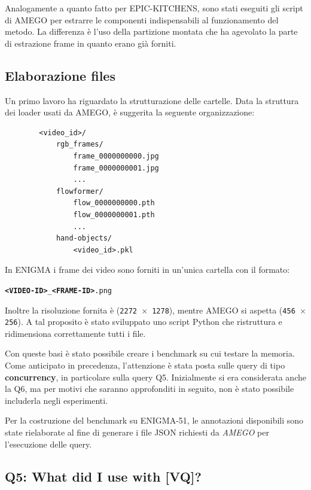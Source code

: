 Analogamente a quanto fatto per EPIC-KITCHENS, sono stati eseguiti gli script di AMEGO per estrarre le componenti indispensabili al funzionamento del metodo. La differenza è l'uso della partizione montata che ha agevolato la parte di estrazione frame in quanto erano già forniti.

\subsection*{Elaborazione files}
Un primo lavoro ha riguardato la strutturazione delle cartelle. Data la struttura dei loader usati da AMEGO, è suggerita la seguente organizzazione:
\begin{center}
    \begin{verbatim}
        <video_id>/
            rgb_frames/
                frame_0000000000.jpg
                frame_0000000001.jpg
                ...
            flowformer/
                flow_0000000000.pth
                flow_0000000001.pth
                ...
            hand-objects/
                <video_id>.pkl
    \end{verbatim}    
\end{center}

In ENIGMA i frame dei video sono forniti in un'unica cartella con il formato:
\begin{center}
\texttt{\textbf{<VIDEO-ID>}\_\textbf{<FRAME-ID>}.png}    
\end{center}
Inoltre la risoluzione fornita è (\texttt{2272 $\times$ 1278}), mentre AMEGO si aspetta (\texttt{456 $\times$ 256}). A tal proposito è stato sviluppato uno script Python che ristruttura e ridimensiona correttamente tutti i file.

Con queste basi è stato possibile creare i benchmark su cui testare la memoria. Come anticipato in precedenza, l'attenzione è stata posta sulle query di tipo \textbf{concurrency}, in particolare sulla query Q5. Inizialmente si era considerata anche la Q6, ma per motivi che saranno approfonditi in seguito, non è stato possibile includerla negli esperimenti.

Per la costruzione del benchmark su ENIGMA-51, le annotazioni disponibili sono state rielaborate al fine di generare i file JSON richiesti da \emph{AMEGO} per l'esecuzione delle query.

\subsection*{Q5: What did I use with [VQ]?}

